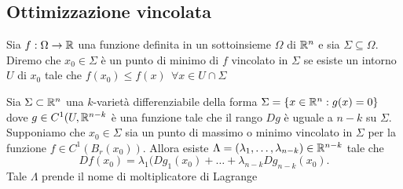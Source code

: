 \documentclass[12px]{article}
\begin{document}
\subsection{Ottimizzazione vincolata}
\begin{defi}
	Sia $f:\Omega \rightarrow \mathbb{R}$ una funzione definita in un sottoinsieme $\Omega$ di $\mathbb{R}^n$ e sia $\Sigma \subseteq\Omega$. Diremo che  $x_0\in \Sigma$ è un punto di minimo di $f$ vincolato in $\Sigma$ se esiste un intorno $U$ di $x_0$ tale che $f(x_0)\leq f(x) \ \ \forall x\in U\cap \Sigma$
\end{defi}
\begin{teo}
	Sia $\Sigma\subset\mathbb{R}^n$ una  $k$-varietà differenziabile della forma $\Sigma = \{x\in\mathbb{R}^n: g(x) = 0\}$ dove  $g\in C^1(U,\mathbb{R}^{n-k}$ è una funzione tale che il rango  $Dg$ è uguale a $n-k$ su $\Sigma$. Supponiamo che $x_0\in\Sigma$ sia un punto di massimo o minimo vincolato in $\Sigma$ per la funzione  $f\in C^1(B_r(x_0)).$ Allora esiste $\Lambda = (\lambda_1,\ldots,\lambda_{n-k})\in\mathbb{R}^{n-k}$ tale che
	\[
		Df(x_0) = \lambda_1(Dg_1(x_0) + \ldots + \lambda_{n-k}Dg_{n-k}(x_0)
	.\] 
	Tale $\Lambda$ prende il nome di moltiplicatore di Lagrange
\end{teo}
\end{document}
